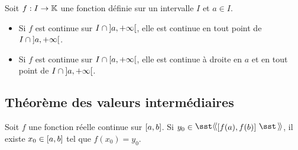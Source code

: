 \documentclass{magnolia}
\begin{document}
\begin{proposition}
Soit $f:I\to\mathbb{K}$ une fonction définie sur un intervalle $I$ et $a\in I$.
\begin{itemize}
\item Si $f$ est continue sur $I\cap\left]a,+\infty\right[$, elle est continue en tout
  point de $I\cap\left]a,+\infty\right[$.
\item Si $f$ est continue sur $I\cap\left[a,+\infty\right[$, elle est continue à droite
  en $a$ et en tout point de $I\cap\left]a,+\infty\right[$.
\end{itemize}
\end{proposition}


\subsection{Théorème des valeurs intermédiaires}

\begin{theoreme}[nom={Théorème des valeurs intermédiaires}]
Soit $f$ une fonction réelle continue sur $\left[a,b\right]$. Si
  $y_0\in\intergf{f(a)}{f(b)}$, il existe $x_0\in\left[a,b\right]$ tel
  que $f(x_0)=y_0$.
\end{theoreme}
\end{document}

